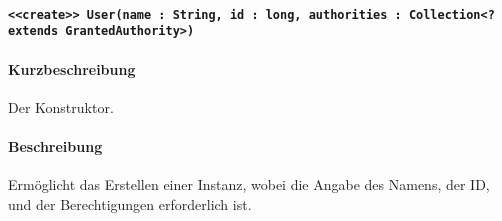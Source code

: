 \paragraph{\texttt{<<create>> User(name : String, id : long, authorities : Collection<? extends GrantedAuthority>)}}%
\paragraph*{Kurzbeschreibung}
Der Konstruktor.
\paragraph*{Beschreibung}
Ermöglicht das Erstellen einer Instanz, wobei die Angabe des Namens, der ID, und der Berechtigungen erforderlich ist.
